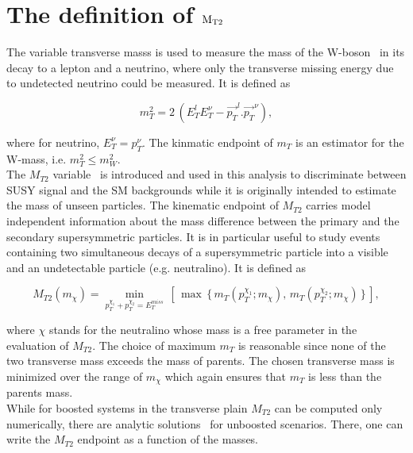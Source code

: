 \section{\texorpdfstring{The definition of $\rm {M_{T2}}$}{The definition of MT2}}
\label{sect:mt2def}
The variable transverse masss is used to measure the mass of the W-boson~\cite{Arnison:1983rp,Banner:1983jy,Affolder:2000bpa,Abazov:2002bu} in its decay to a lepton and a neutrino, where only the transverse missing energy due to undetected neutrino could be measured. It is defined as 
\begin{linenomath}
\begin{equation}
\label{eq:mtdef}
m_{T}^{2}= 2\,( E_T^lE_T^\nu-\vec{p_T}^l.\vec{p_T}^\nu ),
\end{equation}
\end{linenomath}
where for neutrino, $E_T^\nu=p_T^\nu$. The kinmatic endpoint of $m_T$ is an estimator for the W-mass, i.e. $m_T^2\leq m_W^2$. \\
The $M_{T2}$ variable~\cite{Lester:1999tx,Barr:2003rg} is introduced and used in this analysis to discriminate between SUSY signal and the SM backgrounds while it is originally intended to estimate the mass of unseen particles. The kinematic endpoint of $M_{T2}$ carries model independent information about the mass difference between the primary and the secondary supersymmetric particles. It is in particular useful to study events containing two simultaneous decays of a supersymmetric particle into a visible and an undetectable particle (e.g. neutralino). It is defined as
\begin{linenomath}
\begin{equation}
\label{eq:mt2def}
M_{T2}(m_{\chi})= \min_{p_{T}^{\chi_1}+p_{T}^{\chi_2}=E_T^{miss}}\,\left[\,\max\,\{ \, m_{T}(p_T^{\chi_1};m_{\chi}),\,m_{T}(p_T^{\chi_2};m_{\chi})\,\}\,\right],
\end{equation}
\end{linenomath}
where $\chi$ stands for the neutralino whose mass is a free parameter in the evaluation of $M_{T2}$. The choice of maximum $m_T$ is reasonable since none of the two transverse mass exceeds the mass of parents. The chosen transverse mass is minimized over the range of $m_{\chi}$ which again ensures that $m_T$ is less than the parents mass. \\
While for boosted systems in the transverse plain $M_{T2}$ can be computed only numerically, there are analytic solutions~\cite{Cho:2007dh} for unboosted scenarios. There, one can write the $M_{T2}$ endpoint as a function of the masses. \\
